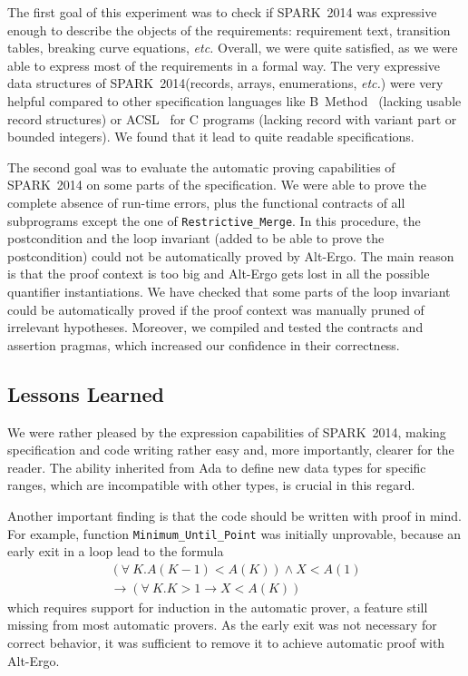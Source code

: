 \documentclass[10pt,a4paper,twocolumn]{article}
\newcommand{\newspark}{SPARK~2014\xspace}
\newcommand{\altergo}{Alt-Ergo\xspace}
\newcommand{\etc}{\textit{etc.}\xspace}
\begin{document}
The first goal of this experiment was to check if \newspark was
expressive enough to describe the objects of the requirements:
requirement text, transition tables, breaking curve equations, \etc
Overall, we were quite satisfied, as we were able to express most of
the requirements in a formal way. The very expressive data structures
of \newspark (records, arrays, enumerations, \etc) were very helpful
compared to other specification languages like B~Method~\cite{b-book}
(lacking usable record structures) or ACSL~\cite{acsl} for C programs
(lacking record with variant part or bounded integers).  We found that
it lead to quite readable specifications.

The second goal was to evaluate the automatic proving capabilities of
\newspark on some parts of the specification. We were able to prove
the complete absence of run-time errors, plus the functional contracts of all
subprograms except the one of \verb|Restrictive_Merge|. In this
procedure, the postcondition and the loop invariant (added to be able
to prove the postcondition) could not be automatically proved by
\altergo. The main reason is that the proof context is too big and
\altergo gets lost in all the possible quantifier instantiations. We
have checked that some parts of the loop invariant could be
automatically proved if the proof context was manually pruned of
irrelevant hypotheses. Moreover, we compiled and tested the contracts
and assertion pragmas, which increased our confidence in their
correctness.

\subsection{Lessons Learned}

We were rather pleased by the expression capabilities of \newspark,
making specification and code writing rather easy and, more
importantly, clearer for the reader. The ability inherited from Ada to
define new data types for specific ranges, which are incompatible with
other types, is crucial in this regard.

Another important finding is that the code should be written with
proof in mind. For example, function \verb|Minimum_Until_Point| was
initially unprovable, because an early exit in a loop lead to the
formula {\footnotesize
\begin{multline*}
(\forall~K. A(K-1)<A(K)) \wedge X<A(1) \\
\rightarrow (\forall~K. K>1 \rightarrow X<A(K))
\end{multline*}
}
which requires support for induction in the automatic prover, a
feature still missing from most automatic provers. As the early exit
was not necessary for correct behavior, it was sufficient to remove it
to achieve automatic proof with \altergo.
\end{document}
